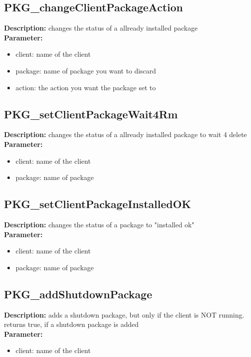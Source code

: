 \subsection{PKG\_changeClientPackageAction}
\textbf{Description:} changes the status of a allready installed package\\
\textbf{Parameter:}
\begin{itemize}
\item client: name of the client
\item package: name of package you want to discard
\item action: the action you want the package set to
\end{itemize}

\subsection{PKG\_setClientPackageWait4Rm}
\textbf{Description:} changes the status of a allready installed package to wait 4 delete\\
\textbf{Parameter:}
\begin{itemize}
\item client: name of the client
\item package: name of package
\end{itemize}

\subsection{PKG\_setClientPackageInstalledOK}
\textbf{Description:} changes the status of a package to "installed ok"\\
\textbf{Parameter:}
\begin{itemize}
\item client: name of the client
\item package: name of package
\end{itemize}

\subsection{PKG\_addShutdownPackage}
\textbf{Description:} adds a shutdown package, but only if the client is NOT running. returns true, if a shutdown package is added\\
\textbf{Parameter:}
\begin{itemize}
\item client: name of the client
\end{itemize}

